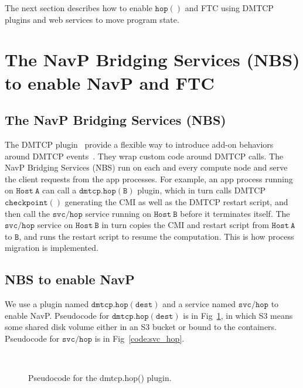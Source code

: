 \documentclass[conference]{IEEEtran}
\begin{document}
The next section describes how to enable $\mathtt{hop()}$ and FTC using DMTCP plugins and web services to move program state.


\section{The NavP Bridging Services (NBS) to enable NavP and FTC}
\label{sec:s2}

\subsection{The NavP Bridging Services (NBS)}
\label{subsec:s21}

The DMTCP plugin~\cite{dmtcp-openproc-2013} provide a flexible way to introduce add-on behaviors around DMTCP events~\cite{ansel2009dmtcp}. They wrap custom code around DMTCP calls. The NavP Bridging Services (NBS) run on each and every compute node and serve the client requests from the app processes. For example, an app process running on $\mathtt{Host~A}$ can call a $\mathtt{dmtcp.hop(B)}$ plugin, which in turn calls DMTCP $\mathtt{checkpoint()}$ generating the CMI as well as the DMTCP restart script, and then call the $\mathtt{svc/hop}$ service running on $\mathtt{Host~B}$ before it terminates itself. The $\mathtt{svc/hop}$ service on $\mathtt{Host~B}$ in turn copies the CMI and restart script from $\mathtt{Host~A}$ to $\mathtt{B}$, and runs the restart script to resume the computation. This is how process migration is implemented.

\subsection{NBS to enable NavP}
\label{subsec:s22}

We use a plugin named $\mathtt{dmtcp.hop(dest)}$ and a service named $\mathtt{svc/hop}$ to enable NavP. 
Pseudocode for $\mathtt{dmtcp.hop(dest)}$ is in Fig~\ref{code:dmtcp_hop}, in which S3 means some shared disk volume either 
in an S3 bucket or bound to the containers. Pseudocode for $\mathtt{svc/hop}$ is in Fig~\ref{code:svc_hop}.

\begin{figure}[!ht]
\vspace{0.1in}
\begin{center}
\begin{center}
\mbox{}\\[0.3em]
\end{center}
\hspace{\fill}%
\caption{Pseudocode for the dmtcp.hop() plugin.}
\label{code:dmtcp_hop}
\end{center}
\end{figure}
\end{document}
